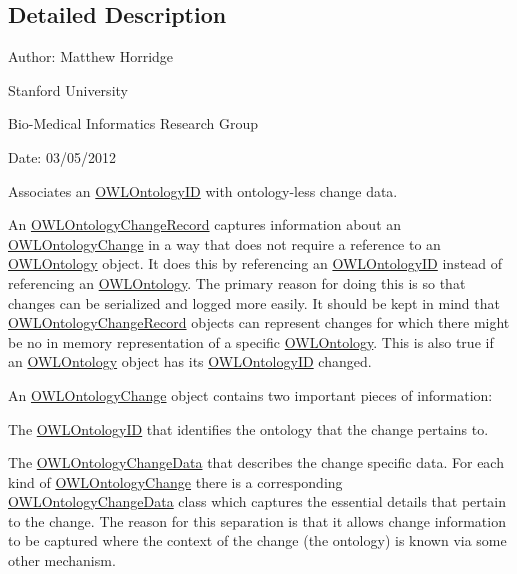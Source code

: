 \subsection{Detailed Description}
Author\-: Matthew Horridge\par
 Stanford University\par
 Bio-\/\-Medical Informatics Research Group\par
 Date\-: 03/05/2012 

Associates an \hyperlink{}{O\-W\-L\-Ontology\-I\-D} with ontology-\/less change data. 

An \hyperlink{classorg_1_1semanticweb_1_1owlapi_1_1change_1_1_o_w_l_ontology_change_record}{O\-W\-L\-Ontology\-Change\-Record} captures information about an \hyperlink{}{O\-W\-L\-Ontology\-Change} in a way that does not require a reference to an \hyperlink{}{O\-W\-L\-Ontology} object. It does this by referencing an \hyperlink{}{O\-W\-L\-Ontology\-I\-D} instead of referencing an \hyperlink{}{O\-W\-L\-Ontology}. The primary reason for doing this is so that changes can be serialized and logged more easily. It should be kept in mind that \hyperlink{classorg_1_1semanticweb_1_1owlapi_1_1change_1_1_o_w_l_ontology_change_record}{O\-W\-L\-Ontology\-Change\-Record} objects can represent changes for which there might be no in memory representation of a specific \hyperlink{}{O\-W\-L\-Ontology}. This is also true if an \hyperlink{}{O\-W\-L\-Ontology} object has its \hyperlink{}{O\-W\-L\-Ontology\-I\-D} changed. 

An \hyperlink{}{O\-W\-L\-Ontology\-Change} object contains two important pieces of information\-: 
\begin{DoxyEnumerate}
\item The \hyperlink{}{O\-W\-L\-Ontology\-I\-D} that identifies the ontology that the change pertains to.  
\item The \hyperlink{classorg_1_1semanticweb_1_1owlapi_1_1change_1_1_o_w_l_ontology_change_data}{O\-W\-L\-Ontology\-Change\-Data} that describes the change specific data. For each kind of \hyperlink{}{O\-W\-L\-Ontology\-Change} there is a corresponding \hyperlink{classorg_1_1semanticweb_1_1owlapi_1_1change_1_1_o_w_l_ontology_change_data}{O\-W\-L\-Ontology\-Change\-Data} class which captures the essential details that pertain to the change. The reason for this separation is that it allows change information to be captured where the context of the change (the ontology) is known via some other mechanism.  
\end{DoxyEnumerate}


